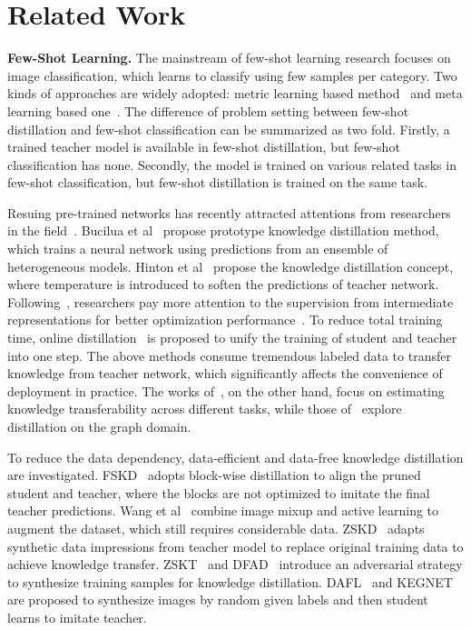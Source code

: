 \documentclass[letterpaper]{article} %
\begin{document}
\section{Related Work}
{
    {\bf Few-Shot Learning. }
    The mainstream of few-shot learning research focuses on image classification, which learns to classify using few samples per category.
    Two kinds of approaches are widely adopted: metric learning based method~\cite{koch2015siamese,vinyals2016matching,NIPS2017_6996} and meta learning based one~\cite{ravi2017optimization,wang2016learning,santoro2016one}.
    The difference of problem setting between few-shot distillation and few-shot classification can be summarized as two fold.
    Firstly, a trained teacher model is available in few-shot distillation, but few-shot classification has none.
    Secondly, the model is trained on various related tasks in few-shot classification, but few-shot distillation is trained on the same task.


    Resuing pre-trained networks has recently attracted attentions from researchers in the field~\cite{Chen_2020_CVPR,Yu_2017_CVPR}.
    Bucilua et al~\cite{bucilua2006model} propose prototype knowledge distillation method, which trains a neural network using
    predictions from an ensemble of heterogeneous models.
    Hinton et al~\cite{hinton2015distilling} propose the knowledge distillation concept, where temperature is introduced to soften the predictions of teacher network.
    Following~\cite{hinton2015distilling}, researchers pay more attention to the supervision from intermediate representations for better optimization performance~\cite{romero2015fitnets,Wang2018ProgressiveBK,shen2019amalgamating,shen2019customizing,ye2020data,luo2020collaboration}.
    To reduce total training time, online distillation~\cite{yang2019snapshot,zhang2019your} is proposed to unify the training of student and teacher into one step.
    The above methods consume tremendous labeled data to transfer
    knowledge from teacher network, which significantly affects
    the convenience of deployment in practice.
    The works of~\cite{Song_2019_NeurIPS,Song_2020_CVPR},
    on the other hand, focus on
    estimating knowledge transferability
    across different tasks, while
    those of~\cite{Yang_2020_CVPR,Yang_2020_NIPS}
    explore distillation on the graph domain.

    To reduce the data dependency, data-efficient and data-free knowledge distillation are investigated.
    FSKD~\cite{li2018few} adopts block-wise distillation to align the pruned student and teacher, where the blocks are not optimized to imitate the final teacher predictions.
    Wang et al~\cite{wang2020neural} combine image mixup and active learning to augment the dataset, which still requires considerable data.
    ZSKD~\cite{nayak2019zero} adapts synthetic data impressions from teacher model to replace original training data to achieve knowledge transfer.
    ZSKT~\cite{micaelli2019zero} and DFAD~\cite{fang2019data} introduce an adversarial strategy to synthesize training samples for knowledge distillation.
    DAFL~\cite{chen2019data} and KEGNET~\cite{yoo2019knowledge} are proposed to synthesize images by random given labels and then student learns to imitate teacher.

}
\end{document}
